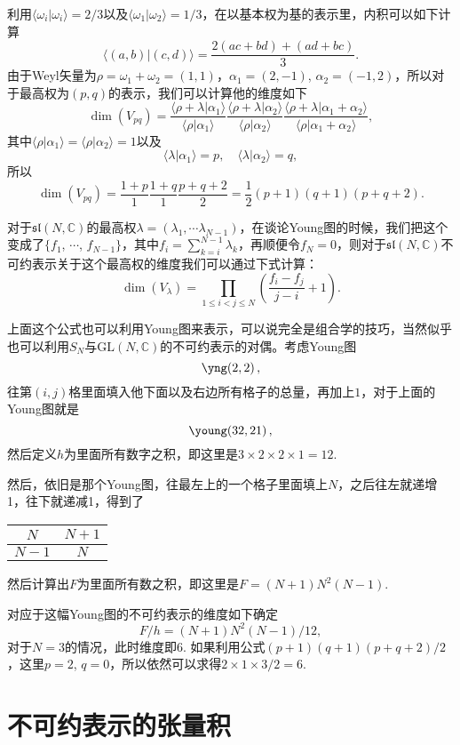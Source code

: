 \documentclass[9pt]{extarticle}
\newcommand{\cc}{\mathbb{C}}
\begin{document}
利用$\langle \omega_i|\omega_i\rangle=2/3$以及$\langle \omega_1|\omega_2\rangle=1/3$，在以基本权为基的表示里，内积可以如下计算
\[
	\langle (a,b)|(c,d) \rangle= \frac{2(ac+bd)+(ad+bc)}{3}.
\]
由于Weyl矢量为$\rho=\omega_1+\omega_2=(1,1)$，$\alpha_1=(2,-1)$, $\alpha_2=(-1,2)$，所以对于最高权为$(p,q)$的表示，我们可以计算他的维度如下
\[
	\dim(V_{pq})=\frac{\langle \rho+\lambda|\alpha_1\rangle}{\langle \rho|\alpha_1\rangle}\frac{\langle \rho+\lambda|\alpha_2\rangle}{\langle \rho|\alpha_2\rangle}\frac{\langle \rho+\lambda|\alpha_1+\alpha_2\rangle}{\langle \rho|\alpha_1+\alpha_2\rangle},
\]
其中$\langle \rho|\alpha_1\rangle=\langle \rho|\alpha_2\rangle=1$以及
\[
\langle \lambda|\alpha_1\rangle=p,\quad \langle \lambda|\alpha_2\rangle=q,
\]
所以
\[
	\dim(V_{pq})=\frac{1+p}{1}\frac{1+q}{1}\frac{p+q+2}{2}=\frac{1}{2}(p+1)(q+1)(p+q+2).
\]

\para 对于$\mathfrak{sl}(N,\cc)$的最高权$\lambda=(\lambda_1,\cdots \lambda_{N-1})$，在谈论Young图的时候，我们把这个变成了$\{f_1$, $\cdots$, $f_{N-1}\}$，其中$f_i=\sum_{k=i}^{N-1}\lambda_k$，再顺便令$f_N=0$，则对于$\mathfrak{sl}(N,\cc)$不可约表示关于这个最高权的维度我们可以通过下式计算：
\[
	\dim(V_\lambda)=\prod_{1\leq i<j\leq N}\left(\frac{f_i-f_j}{j-i}+1\right).
\]

上面这个公式也可以利用Young图来表示，可以说完全是组合学的技巧，当然似乎也可以利用$S_N$与$\mathrm{GL}(N,\cc)$的不可约表示的对偶。考虑Young图
\[
	\yng(2,2)\,,
\]
往第$(i,j)$格里面填入他下面以及右边所有格子的总量，再加上$1$，对于上面的Young图就是
\[
	\young(32,21)\,,
\]
然后定义$h$为里面所有数字之积，即这里是$3\times 2\times 2\times 1=12$.

然后，依旧是那个Young图，往最左上的一个格子里面填上$N$，之后往左就递增1，往下就递减1，得到了
\begin{center}
  \begin{tabular}{ | c | c |}
    \hline
    $N$ & $N+1$  \\ \hline
    $N-1$ & $N$\\
    \hline
  \end{tabular}
\end{center}
然后计算出$F$为里面所有数之积，即这里是$F=(N+1)N^2(N-1)$.

对应于这幅Young图的不可约表示的维度如下确定
\[
	F/h=(N+1)N^2(N-1)/12,
\]
对于$N=3$的情况，此时维度即$6$. 如果利用公式$(p+1)(q+1)(p+q+2)/2$，这里$p=2$, $q=0$，所以依然可以求得$2\times 1\times 3/2=6$.

\section{不可约表示的张量积}
\end{document}
